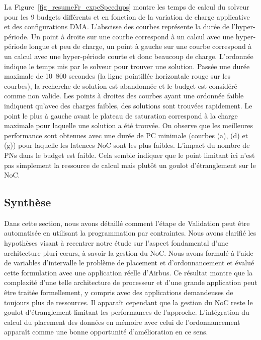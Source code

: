 \documentclass[main.tex]{subfiles}
\begin{document}
La Figure~\ref{fig_resumeFr_expeSpeedups} montre les temps de calcul du solveur pour les 9 budgets différents et en fonction de la variation de charge applicative et des configurations DMA. L'abscisse des courbes représente la durée de l'hyper-période. Un point à droite sur une courbe correspond à un calcul avec une hyper-période longue et peu de charge, un point à gauche sur une courbe correspond à un calcul avec une hyper-période courte et donc beaucoup de charge. L'ordonnée indique le temps mis par le solveur pour trouver une solution. Passée une durée maximale de 10~800 secondes (la ligne pointillée horizontale rouge sur les courbes), la recherche de solution est abandonnée et le budget est considéré comme non valide. Les points à droites des courbes ayant une ordonnée faible indiquent qu'avec des charges faibles, des solutions sont trouvées rapidement. Le point le plus à gauche avant le plateau de saturation correspond à la charge maximale pour laquelle une solution a été trouvée. On observe que les meilleures performance sont obtenues avec une durée de PC minimale (courbes (a), (d) et (g)) pour laquelle les latences NoC sont les plus faibles. L'impact du nombre de PNs dans le budget est faible. Cela semble indiquer que le point limitant ici n'est pas simplement la ressource de calcul  mais plutôt un goulot d'étranglement sur le NoC.



\subsection{Synthèse}
Dans cette section, nous avons détaillé comment l'étape de Validation peut être automatisée en utilisant la programmation par contraintes. Nous avons clarifié les hypothèses visant à recentrer notre étude sur l'aspect fondamental d'une architecture pluri-c\oe{}urs, à savoir la gestion du NoC. Nous avons formulé à l'aide de variables d'intervalle le problème de placement et d'ordonnancement et évalué cette formulation avec une application réelle d'Airbus. Ce résultat montre que la complexité d'une telle architecture de processeur et d'une grande application peut être traitée formellement, y compris avec des applications demandeuses de toujours plus de ressources. Il apparaît cependant que la gestion du NoC reste le goulot d'étranglement limitant les performances de l'approche. L'intégration du calcul du placement des données en mémoire avec celui de l'ordonnancement apparaît comme une bonne opportunité d'amélioration en ce sens.
\end{document}
